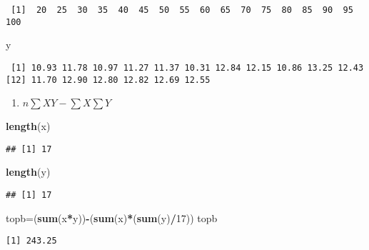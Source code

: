 \documentclass[]{article}
\newenvironment{Shaded}{\begin{snugshade}}{\end{snugshade}}
\newcommand{\KeywordTok}[1]{\textcolor[rgb]{0.13,0.29,0.53}{\textbf{#1}}}
\newcommand{\DecValTok}[1]{\textcolor[rgb]{0.00,0.00,0.81}{#1}}
\newcommand{\OperatorTok}[1]{\textcolor[rgb]{0.81,0.36,0.00}{\textbf{#1}}}
\newcommand{\NormalTok}[1]{#1}
\providecommand{\tightlist}{%
  \setlength{\itemsep}{0pt}\setlength{\parskip}{0pt}}
\begin{document}
\begin{verbatim}
 [1]  20  25  30  35  40  45  50  55  60  65  70  75  80  85  90  95 100
\end{verbatim}

\begin{Shaded}
\begin{Highlighting}[]
\NormalTok{y}
\end{Highlighting}
\end{Shaded}

\begin{verbatim}
 [1] 10.93 11.78 10.97 11.27 11.37 10.31 12.84 12.15 10.86 13.25 12.43
[12] 11.70 12.90 12.80 12.82 12.69 12.55
\end{verbatim}

\begin{enumerate}
\def\labelenumi{\arabic{enumi}.}
\tightlist
\item
  \(n\sum XY -\sum X\sum Y\)
\end{enumerate}

\begin{Shaded}
\begin{Highlighting}[]
\KeywordTok{length}\NormalTok{(x)}
\end{Highlighting}
\end{Shaded}

\begin{verbatim}
## [1] 17
\end{verbatim}

\begin{Shaded}
\begin{Highlighting}[]
\KeywordTok{length}\NormalTok{(y)}
\end{Highlighting}
\end{Shaded}

\begin{verbatim}
## [1] 17
\end{verbatim}

\begin{Shaded}
\begin{Highlighting}[]
\NormalTok{topb=(}\KeywordTok{sum}\NormalTok{(x}\OperatorTok{*}\NormalTok{y))}\OperatorTok{-}\NormalTok{(}\KeywordTok{sum}\NormalTok{(x)}\OperatorTok{*}\NormalTok{(}\KeywordTok{sum}\NormalTok{(y)}\OperatorTok{/}\DecValTok{17}\NormalTok{))}
\NormalTok{topb}
\end{Highlighting}
\end{Shaded}

\begin{verbatim}
[1] 243.25
\end{verbatim}
\end{document}
